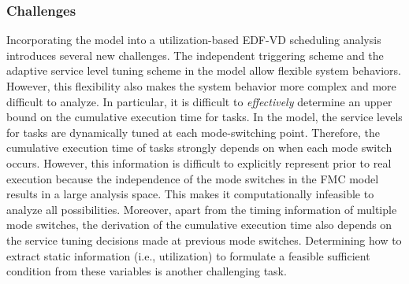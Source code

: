 \documentclass[10pt,journal,compsoc]{IEEEtran}
\begin{document}
\subsubsection{\textbf{Challenges}}
Incorporating the \FMC model into a utilization-based EDF-VD scheduling analysis introduces several new challenges. The independent triggering scheme and the adaptive service level tuning scheme in the \FMC model allow flexible system behaviors. However, this flexibility also makes the system behavior more complex and more difficult to analyze. In particular, it is difficult to \textit{effectively} determine an upper bound on the cumulative execution time for \lo tasks. In the \FMC model, the service levels for \lo tasks are dynamically tuned at each mode-switching point. Therefore, the cumulative execution time of \lo tasks strongly depends on when each mode switch occurs. However, this information is difficult to explicitly represent prior to real execution because the independence of the mode switches in the FMC model results in a large analysis space. This makes it computationally infeasible to analyze all possibilities. Moreover, apart from the timing information of multiple mode switches, the derivation of the cumulative execution time also depends on the service tuning decisions made at previous mode switches. Determining how to extract static information (i.e., utilization) to formulate a feasible sufficient condition from these variables is another challenging task.
\end{document}
